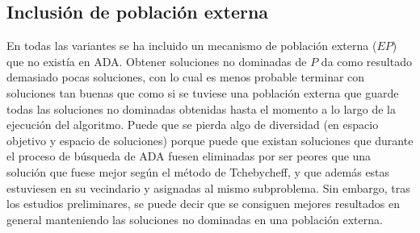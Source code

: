 \begin{table}[h]
\centering
\caption{Variantes de ADA comparadas}
\label{tab:constraints}
\end{table}

\subsection{Inclusión de población externa}

En todas las variantes se ha incluido un mecanismo de población externa ($EP$) que no existía en ADA. Obtener soluciones no dominadas de $P$ da como resultado demasiado pocas soluciones, con lo cual es menos probable terminar con soluciones tan buenas que como si se tuviese una población externa que guarde todas las soluciones no dominadas obtenidas hasta el momento a lo largo de la ejecución del algoritmo. Puede que se pierda algo de diversidad (en espacio objetivo y espacio de soluciones) porque puede que existan soluciones que durante el proceso de búsqueda de ADA fuesen eliminadas por ser peores que una solución que fuese mejor según el método de Tchebycheff, y que además estas estuviesen en su vecindario y asignadas al mismo subproblema. Sin embargo, tras los estudios preliminares, se puede decir que se consiguen mejores resultados en general manteniendo las soluciones no dominadas en una población externa.

